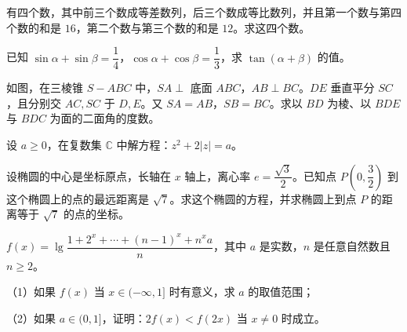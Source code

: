 \begin{question}
有四个数，其中前三个数成等差数列，后三个数成等比数列，并且第一个数与第四个数的和是 $16$，第二个数与第三个数的和是 $12$。求这四个数。

\end{question}
\begin{question}
已知 $\sin\alpha+\sin\beta=\dfrac14$，$\cos\alpha+\cos\beta=\dfrac13$，求 $\tan(\alpha+\beta)$ 的值。

\Needspace{0.4\textheight}
\end{question}
\begin{question}
如图，在三棱锥 $S-ABC$ 中，$SA\perp$ 底面 $ABC$，$AB\perp BC$。$DE$ 垂直平分 $SC$，且分别交 $AC,SC$ 于 $D,E$。又 $SA=AB$，$SB=BC$。求以 $BD$ 为棱、以 $BDE$ 与 $BDC$ 为面的二面角的度数。
\nopagebreak[4]
\begin{center}\end{center}
\nopagebreak[4]
\end{question}
\begin{question}
设 $a\ge0$，在复数集 $\mathbb C$ 中解方程：$z^2+2|z|=a$。

\end{question}
\begin{question}
设椭圆的中心是坐标原点，长轴在 $x$ 轴上，离心率 $e=\dfrac{\sqrt3}{2}$。已知点 $P\left(0,\dfrac32\right)$ 到这个椭圆上的点的最远距离是 $\sqrt7$。求这个椭圆的方程，并求椭圆上到点 $P$ 的距离等于 $\sqrt7$ 的点的坐标。

\end{question}
\begin{question}
$f(x)=\lg\dfrac{1+2^x+\cdots+(n-1)^x+n^x a}{n}$，其中 $a$ 是实数，$n$ 是任意自然数且 $n\ge2$。

（1）如果 $f(x)$ 当 $x\in(-\infty,1]$ 时有意义，求 $a$ 的取值范围；

（2）如果 $a\in(0,1]$，证明：$2f(x)<f(2x)$ 当 $x\ne0$ 时成立。

\end{question}